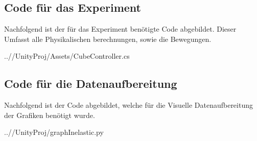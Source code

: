 \documentclass[../main.tex]{subfiles}
\begin{document}
    \subsection{Code für das Experiment}
    Nachfolgend ist der für das Experiment benötigte Code abgebildet.
    Dieser Umfasst alle Physikalischen berechnungen, sowie die Bewegungen.

%    
    \begin{lstinputlisting}[label={lst:lstlisting}]
        {..//UnityProj/Assets/CubeController.cs}
    \end{lstinputlisting}

    \subsection{Code für die Datenaufbereitung}
    Nachfolgend ist der Code abgebildet, welche für die Visuelle Datenaufbereitung der Grafiken
    benötigt wurde.
    \begin{lstinputlisting}[label={lst:lstlisting}]
        {..//UnityProj/graphInelastic.py}
    \end{lstinputlisting}
\end{document}
